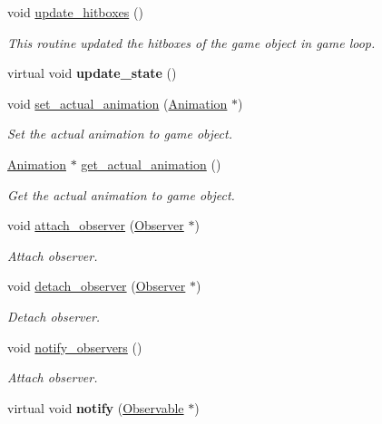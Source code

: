 \begin{DoxyCompactItemize}
\item 
void \hyperlink{classengine_1_1_game_object_a2980a8e0a6828ddc05756fdb9f4d78b7}{update\+\_\+hitboxes} ()
\begin{DoxyCompactList}\small\item\em This routine updated the hitboxes of the game object in game loop. \end{DoxyCompactList}\item 
virtual void {\bfseries update\+\_\+state} ()\hypertarget{classengine_1_1_game_object_a3ff8e4baff0f6e2713bf57b85ba1050a}{}\label{classengine_1_1_game_object_a3ff8e4baff0f6e2713bf57b85ba1050a}

\item 
void \hyperlink{classengine_1_1_game_object_a281a58cba74b80155bc8d54f727f5c2f}{set\+\_\+actual\+\_\+animation} (\hyperlink{classengine_1_1_animation}{Animation} $\ast$)
\begin{DoxyCompactList}\small\item\em Set the actual animation to game object. \end{DoxyCompactList}\item 
\hyperlink{classengine_1_1_animation}{Animation} $\ast$ \hyperlink{classengine_1_1_game_object_ae2136ffcfe9a9e0d44ca20890cbfd77e}{get\+\_\+actual\+\_\+animation} ()
\begin{DoxyCompactList}\small\item\em Get the actual animation to game object. \end{DoxyCompactList}\item 
void \hyperlink{classengine_1_1_game_object_a3b266846fd1c038dd0e567848060a7c3}{attach\+\_\+observer} (\hyperlink{classengine_1_1_observer}{Observer} $\ast$)
\begin{DoxyCompactList}\small\item\em Attach observer. \end{DoxyCompactList}\item 
void \hyperlink{classengine_1_1_game_object_a8cc6e4a6e7723ee74bbc35228d82b640}{detach\+\_\+observer} (\hyperlink{classengine_1_1_observer}{Observer} $\ast$)
\begin{DoxyCompactList}\small\item\em Detach observer. \end{DoxyCompactList}\item 
void \hyperlink{classengine_1_1_game_object_a0c671e93cdf2b6ba8fbe22da0be51cc2}{notify\+\_\+observers} ()
\begin{DoxyCompactList}\small\item\em Attach observer. \end{DoxyCompactList}\item 
virtual void {\bfseries notify} (\hyperlink{classengine_1_1_observable}{Observable} $\ast$)\hypertarget{classengine_1_1_game_object_aa1ccfdc0753b18902be80c2866c543a0}{}\label{classengine_1_1_game_object_aa1ccfdc0753b18902be80c2866c543a0}

\end{DoxyCompactItemize}
